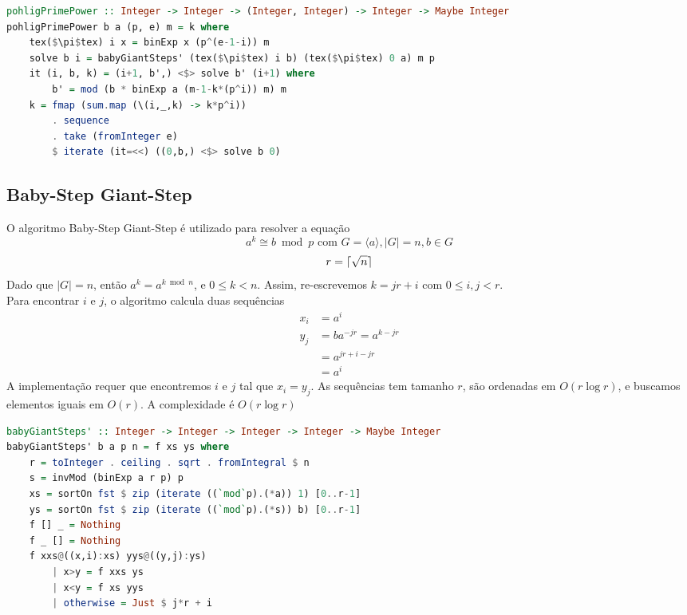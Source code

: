 \documentclass{article}
\DeclarePairedDelimiter{\ceil}{\lceil}{\rceil}
\begin{document}
\noindent\hspace{0.03\linewidth}
\begin{minipage}{.9\linewidth}
\begin{lstlisting}[language=haskell,caption=Pohlig Prime Power]
pohligPrimePower :: Integer -> Integer -> (Integer, Integer) -> Integer -> Maybe Integer
pohligPrimePower b a (p, e) m = k where
    tex($\pi$tex) i x = binExp x (p^(e-1-i)) m
    solve b i = babyGiantSteps' (tex($\pi$tex) i b) (tex($\pi$tex) 0 a) m p
    it (i, b, k) = (i+1, b',) <$> solve b' (i+1) where
        b' = mod (b * binExp a (m-1-k*(p^i)) m) m
    k = fmap (sum.map (\(i,_,k) -> k*p^i))
        . sequence
        . take (fromInteger e)
        $ iterate (it=<<) ((0,b,) <$> solve b 0)
\end{lstlisting}
\end{minipage}

\subsection{Baby-Step Giant-Step}
O algoritmo Baby-Step Giant-Step é utilizado para resolver a equação
$$ a^k \cong b \bmod p \text{ com } G = \langle a \rangle, |G| = n, b \in G$$
$$ r = \ceil{\sqrt{n}}$$
Dado que $ |G| = n $, então $ a^k = a^{k \bmod n} $, e $ 0 \leq k < n $. Assim, re-escrevemos $ k = j r + i $ com $ 0 \leq i, j < r $.\\
Para encontrar $i$ e $j$, o algoritmo calcula duas sequências
\begin{align*}
    x_i &= a^i\\
    y_j &= b a^{-j r} = a^{k - j r}\\
        &= a^{j r + i - j r}\\
        &= a^{i}
\end{align*}
A implementação requer que encontremos $i$ e $j$ tal que $x_i = y_j$. As sequências tem tamanho $r$, são ordenadas em $O(r \log r)$, e buscamos elementos iguais em $O(r)$. A complexidade é $O(r \log r)$

\noindent\hspace{0.03\linewidth}
\begin{minipage}{.9\linewidth}
\begin{lstlisting}[language=haskell,caption=Baby-Steps Giant-Steps]
babyGiantSteps' :: Integer -> Integer -> Integer -> Integer -> Maybe Integer
babyGiantSteps' b a p n = f xs ys where
    r = toInteger . ceiling . sqrt . fromIntegral $ n
    s = invMod (binExp a r p) p
    xs = sortOn fst $ zip (iterate ((`mod`p).(*a)) 1) [0..r-1]
    ys = sortOn fst $ zip (iterate ((`mod`p).(*s)) b) [0..r-1]
    f [] _ = Nothing
    f _ [] = Nothing
    f xxs@((x,i):xs) yys@((y,j):ys)
        | x>y = f xxs ys
        | x<y = f xs yys
        | otherwise = Just $ j*r + i
\end{lstlisting}
\end{minipage}
\end{document}
